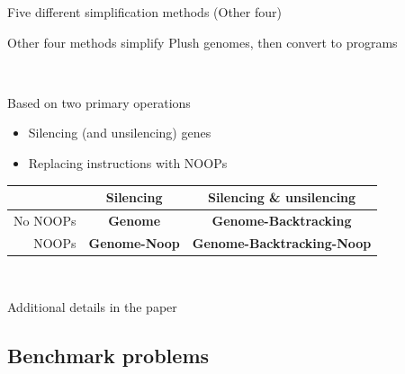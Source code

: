 \documentclass{beamer}
\begin{document}
\begin{frame}{Five different simplification methods (Other four)}

Other four methods simplify Plush genomes, then convert to programs

~

Based on two primary operations
\begin{itemize}
	\item Silencing (and unsilencing) genes
	\item Replacing instructions with NOOPs
\end{itemize}

\begin{center}
\begin{tabular}{r|cc} %
	&  Silencing & Silencing \& unsilencing \\ 
	\hline
	No NOOPs & \textbf{Genome} & \textbf{Genome-Backtracking} \\ 
	NOOPs & \textbf{Genome-Noop} & \textbf{Genome-Back\-tracking-Noop } \\ 
\end{tabular} 
\end{center}


~

Additional details in the paper

\end{frame}

\subsection{Benchmark problems}
\end{document}
